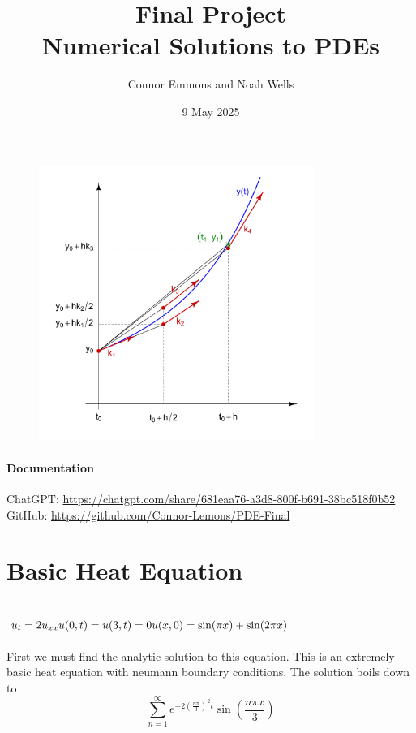 \documentclass{article}
\title{Final Project\\Numerical Solutions to PDEs}
\date{9 May 2025}
\author{Connor Emmons and Noah Wells}
\begin{document}
\maketitle
\begin{figure}[h]
    \centering
    \includegraphics[width=0.8\textwidth]{title.jpg}
\end{figure}
\vfill
\paragraph*{Documentation}
ChatGPT: \url{https://chatgpt.com/share/681eaa76-a3d8-800f-b691-38bc518f0b52}
GitHub: \url{https://github.com/Connor-Lemons/PDE-Final}
\newpage
{}

\section{Basic Heat Equation}

\subsection*{$u_t = 2u_{xx}\\u(0,t) = u(3,t) = 0\\u(x,0) = \sin(\pi x) + \sin(2\pi x)$}

First we must find the analytic solution to this equation. This is an extremely basic heat equation with neumann boundary conditions. The solution boils down to 
\[
\sum_{n=1}^{\infty}e^{-2\left(\frac{n\pi}{3}\right)^{2}t}\sin\left(\frac{n\pi x}{3}\right)
\]
\end{document}
